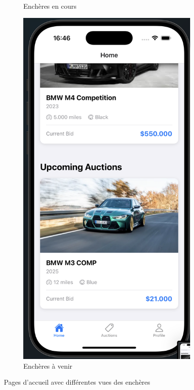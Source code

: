 \begin{figure}[H]
\begin{subfigure}[b]{0.48\textwidth}
        \caption{Enchères en cours}
        \label{fig:home-live}
    \end{subfigure}
    \hfill
    \begin{subfigure}[b]{0.48\textwidth}
        \includegraphics[width=\textwidth]{images/home page with upcoming auctions.png}
        \caption{Enchères à venir}
        \label{fig:home-upcoming}
    \end{subfigure}
    \caption{Pages d'accueil avec différentes vues des enchères}
    \label{fig:home}
\end{figure}


